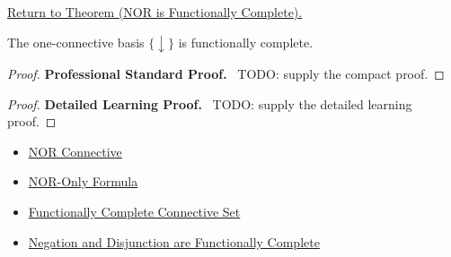 \newpage
{}
\label{prf:nor-functionally-complete-propositional-logic}

\begin{remark*}[Return]
\hyperref[thm:nor-functionally-complete-propositional-logic]{Return to Theorem (NOR is Functionally Complete).}
\end{remark*}

\begin{theorem*}
The one-connective basis \(\{\downarrow\}\) is functionally complete.
\end{theorem*}

\begin{proof}
\textbf{Professional Standard Proof.}~
TODO: supply the compact proof.
\end{proof}

\begin{proof}
\textbf{Detailed Learning Proof.}~
TODO: supply the detailed learning proof.
\end{proof}

\begin{remark*}
\end{remark*}

\begin{dependencies}
\begin{itemize}
  \item \hyperref[def:nor-connective-propositional-logic]{NOR Connective}
  \item \hyperref[def:nor-only-formula-propositional-logic]{NOR-Only Formula}
  \item \hyperref[def:functionally-complete-connective-set-propositional-logic]{Functionally Complete Connective Set}
  \item \hyperref[thm:negation-disjunction-functionally-complete-propositional-logic]{Negation and Disjunction are Functionally Complete}
\end{itemize}
\end{dependencies}

\clearpage
